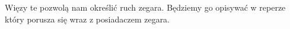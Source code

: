 \begin{comment}

\begin{align*}
L =  \frac{1}{2} \left(  
\eta^{-1} \dot{x} \cdot \dot{x} +  \eta m^2 f( \xi ) \right)  
+ \lambda ( k\cdot k )
\end{align*}
Równanie Eulera-Lagrange'a dla $\eta$ daje dwie możliwości
\begin{align*}
0 = \frac{\partial L }{\partial \eta} =  \frac{1}{2}
\left(m f(\xi) - \eta^{-2} ( \dot{x} \cdot \dot{x} )
  \right).
\end{align*}
Zakładając, że $\eta$ jest zależna od prędkości 
dostajemy więz
\begin{align*}
\eta = \frac{\sqrt{\dot{x} \cdot \dot{x}}}{m f(\xi)}.
\end{align*}
Wtedy lagrangian sprowadza się do postaci wyjściowej 
dla rotatora relatywistycznego~\ref{rotatorStar}.
Gdy założymy, że $\eta$ jest niezależne otrzymujemy
więzy 
\begin{align*}
\dot{x} \cdot \dot{x} = 0, \quad f(\xi) = 0
\end{align*}
Przyjęcie $m =0$ daje automatycznie spełnione warunki 
$P_\mu P^\mu =0$ oraz $W_\mu W^\mu = 0$ i sprowadza 
Lagrangian do postaci~\ref{nullparticlelagrangian}, 
czyli dla swobodnej cząstki 
poruszającej się po krzywej zerowej.
Będziemy zatem traktować $m$ jako parametr w ogólności
niezerowy, co implikuje więz $f(\xi)=0$.
Obliczamy $P_\mu$ oraz $W_\mu$
\begin{align*}
P_\mu &= \eta^{-1} \dot{x}_\mu - 
\frac{\eta m^2}{k\cdot \dot{x}} \xi f'(\xi) k_\mu,\\
\Pi_\mu &= \frac{\eta m^2}{\dot{k}\cdot \dot{k}}
\xi f'(\xi) \dot{k}_\mu, \\
\end{align*}
\begin{align*}
P_\mu &= -2 m^2 \xi f'(\xi),\\
W_\mu W^\mu &= \frac{m^4}{(\dot{k}\cdot \dot{k})^2}
f'(\xi)^2 \xi^2 
\left| 
\begin{array}{ccc}
\dot{k} \cdot \dot{k}& \dot{k} \cdot k& \dot{k} \cdot \dot{x}\\
k \cdot \dot{k}& k \cdot k &k  \cdot \dot{x}\\
\dot{x} \cdot \dot{k}& \dot{x} \cdot k &\dot{x} \cdot \dot{x}
\end{array}
\right|= 
- m^4 \ell^2 \xi f'(\xi)^2
\end{align*}
Ponownie zakładamy
że niezmienniki Casimira $P_\mu P^\mu$ i $W_\mu W^\mu$ 
są parametrami. Daje się 
je zapisać w postaci~\ref{casimir1}~i~\ref{casimir2}.
\begin{align*} 
 -2 \xi f'(\xi)
\stackrel{\ref{casimir1}}{=} 1 \stackrel{\ref{casimir2}}{=}
  4  \xi f'(\xi)^2
\end{align*}
Uzyskaliśmy w ten sposób odpowiednie więzy 
\begin{align*}
f(\xi) = 0, \ f'(\xi) =- \frac{1}{2},\ \xi = 1.
\end{align*}
\begin{align} \label{wiez}
 - \ell^2 \frac{\dot{k} \cdot \dot{k}}{ ( k \cdot \dot{x})^2 } = 1.
\end{align}
\end{comment}
Więzy te pozwolą nam określić ruch zegara. 
Będziemy go opisywać w reperze który porusza się 
wraz z posiadaczem zegara.  
